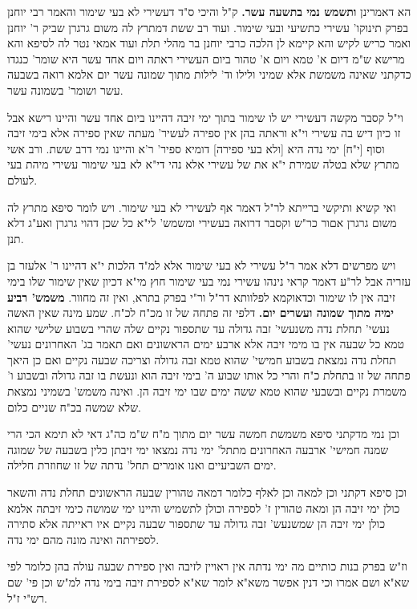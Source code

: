 \documentclass[12pt, openany]{book}
\newcommand{\sethebfont}{
\fontsize{10.5pt}{21.0pt} \selectfont
}
\newcommand{\twocol}[1]{
	{\sethebfont \begin{multicols}{2}
			#1
	\end{multicols}}	
}
\begin{document}
\twocol{הא דאמרינן \textbf{ותשמש נמי בתשעה עשר.}  ק"ל והיכי ס"ד דעשירי לא בעי שימור והאמר רבי יוחנן בפרק תינוקו' עשירי כתשיעי ובעי שימור. ועוד רב ששת דמתרץ לה משום גרגרן שביק ר' יוחנן ואמר כריש לקיש והא קיימא לן הלכה כרבי יוחנן בר מהלי תלת ועוד אמאי נטר לה לסיפא והא מרישא ש"מ דיום א' טמא ויום א' טהור ביום העשירי ראתה ויום אחד עשר היא שומר' כנגדו כדקתני שאינה משמשת אלא שמיני ולילו וד' לילות מתוך שמונה עשר יום אלמא רואה בשבעה עשר ושומר' בשמונה עשר.\par וי"ל קסבר מקשה דעשירי יש לו שימור בתוך ימי זיבה דהיינו ביום אחד עשר והיינו רישא אבל זו כיון דיש בה עשירי וי"א וראתה בהן אין ספירה לעשיר' מעתה שאין ספירה אלא בימי זיבה וסוף [י"ח] ימי נדה היא [ולא בעי ספירה] דומיא ספיר' ר'א והיינו נמי דרב ששת. ורב אשי מתרץ שלא בטלה שמירת י"א את של עשירי אלא נהי די"א לא בעי שימור עשירי מיהת בעי לעולם.\par  ואי קשיא ותיקשי ברייתא לר"ל דאמר אף לעשירי לא בעי שימור. ויש לומר סיפא מתרץ לה משום גרגרן אםור כר"ש וקסבר דרואה בעשירי ומשמש' לי"א כל שכן דהוי גרגרן ואע"ג דלא תנן.\par ויש מפרשים דלא אמר ר"ל עשירי לא בעי שימור אלא למ"ד הלכות י"א דהיינו ר' אלעזר בן עזריה אבל לר"ע דאמר קראי נינהו עשירי נמי בעי שימור חוץ מי"א דכיון שאין שימור שלו בימי זיבה אין לו שימור וכדאוקמא לפלוותא דר"ל ור"י בפרק בתרא, ואין זה מחוור. 
\parמדאמרינן \textbf{משמש' רביע ימיה מתוך שמונה ועשרים יום.}  דלפי זה פתחה של זו מכ"ח לכ"ח. שמע מינה שאין האשה נעשי' תחלת נדה משנעשי' זבה גדולה עד שתספור נקיים שלה שהרי בשבוע שלישי שהוא טמא כל שבעה אין בו מימי זיבה אלא ארבע ימים הראשונים ואם תאמר בג' האחרונים נעשי' תחלת נדה נמצאת בשבוע חמישי' שהוא טמא זבה גדולה וצריכה שבעה נקיים ואם כן היאך פתחה של זו בתחלת כ"ח והרי כל אותו שבוע ה' בימי זיבה הוא ונעשת בו זבה גדולה ובשבוע ו' משמרת נקיים ובשבעי שהוא טמא ששה ימים שבו ימי זיבה הן. ואינה משמש' בשמיני נמצאת שלא שמשה בכ"ח שניים כלום.\par וכן נמי מדקתני סיפא משמשת חמשה עשר יום מתוך מ"ח ש"מ כה"ג דאי לא תימא הכי הרי שמנה חמישי' ארבעה האחרונים מתתל' ימי נדה נמצאו ימי זיבתן כלין בשבעה של שמוגה ימים השביעיים ואנו אומרים תחל' נדתה של זו שחוזרת חלילה.\par  וכן סיפא דקתני וכן למאה וכן לאלף כלומר דמאה טהורין שבעה הראשונים תחלת נדה והשאר כולן ימי זיבה הן ומאה טהורין ז' לספירה וכולן לתשמיש והיינו ימי שמושה כימי זיבתה אלמא כולן ימי זיבה הן שמשנעש' זבה גדולה עד שתספור שבעה נקיים איו ראייתה אלא סתירה לספירתה ואינה מונה מהם ימי נדה.\par וז"ש בפרק בנות כותיים מה ימי נדתה אין ראויין לזיבה ואין ספירת שבעה עולה בהן כלומר לפי שא"א ושם אמרו וכי דנין אפשר משא"א לומר שא"א לספירת זיבה בימי נדה למ"ש וכן פי' שם רש"י ז"ל. 
}
\end{document}
